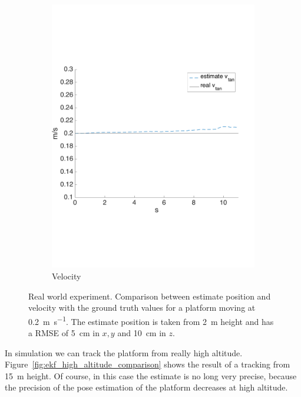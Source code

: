 \begin{figure}[!htbp]
\begin{subfigure}[b]{0.45\textwidth}
        \includegraphics[width=\textwidth]{img/tag_moving_real_world_vel_high_altitude.pdf}
        \caption{Velocity}
        \label{fig:two_ekf_real_world_high}
   \end{subfigure}
  \caption{Real world experiment. Comparison between estimate position and velocity with the ground truth values for a  platform moving at \SI{0.2}{\meter \per \second}. The estimate position  is taken from \SI{2}{\meter} height and has a RMSE of \SI{5}{\centi \meter} in $x,y$ and \SI{10}{\centi \meter} in $z$.}
  \label{fig:ekf_real_world_high}
\end{figure} 

In simulation we can track the platform from really high altitude. Figure~\ref{fig:ekf_high_altitude_comparison} shows the result of a tracking from \SI{15}{\meter} height. Of course, in this case the estimate is no long very precise, because the precision of the pose estimation of the platform decreases at high altitude. 


